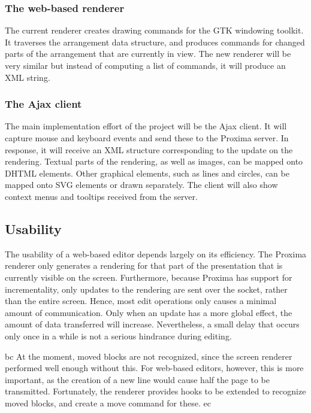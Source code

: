 \documentclass[10pt]{article}
\begin{document}
\subsubsection{The web-based renderer}

The current renderer creates drawing commands for the GTK windowing toolkit. It traverses the arrangement data structure, and produces commands for changed parts of the arrangement that are currently in view. The new renderer will be very similar but instead of computing a list of commands, it will produce an XML string.

\subsubsection{The Ajax client}

The main implementation effort of the project will be the Ajax client. It will capture mouse and keyboard events and send these to the Proxima server. In response, it will receive an XML structure corresponding to the update on the rendering. Textual parts of the rendering, as well as images, can be mapped onto DHTML elements. Other graphical elements, such as lines and circles, can be mapped onto SVG elements or drawn separately. The client will also show context menus and tooltips received from the server.

\bc
\subsection{Usability}

The usability of a web-based editor depends largely on its efficiency. The Proxima renderer only generates a rendering for that part of the presentation that is currently visible on the screen. Furthermore, because Proxima has support for incrementality, only updates to the rendering are sent over the socket, rather than the entire screen. Hence, most edit operations only causes a minimal amount of communication. Only when an update has a more global effect, the amount of data transferred will increase. Nevertheless, a small delay that occurs only once in a while is not a serious hindrance during editing. 

bc
At the moment, moved blocks are not recognized, since the screen renderer performed well enough without this. For web-based editors, however, this is more important, as the creation of a new line would cause half the page to be transmitted. Fortunately, the renderer provides hooks to be extended to recognize moved blocks, and create a move command for these.
ec
\end{document}
